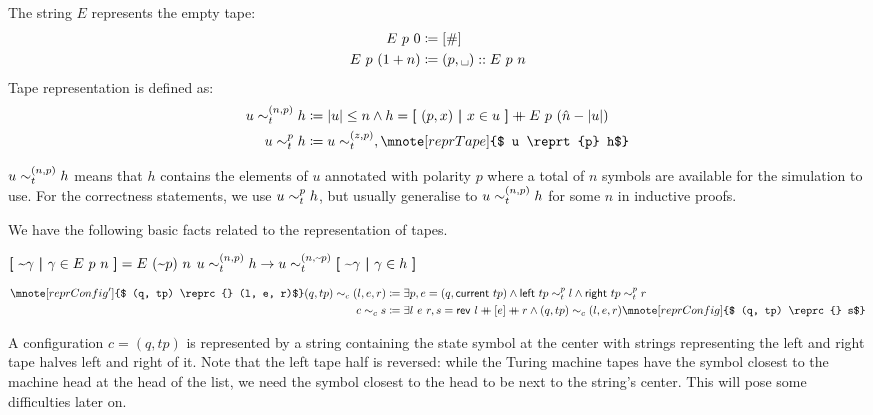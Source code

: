 \begin{definition}
  The string $E$ represents the empty tape: 
  \begin{align*}
    \nilstr{p}{0} &\defeq [\#] \\
    \nilstr{p}{(\natS{n})} &\defeq (p, \blank) :: \nilstr{p}{n}
  \end{align*}
  Tape representation is defined as:
  \begin{align*}
    u \reprtt{n}{p} h &\defeq \length{u} \le n \land h = \withl(p, x) \withm x \in u\withr \concat \nilstr{p}{(\hat{n} - \length{u})}\\
    u \reprt{p} h &\defeq u \reprtt{z}{p}, \mnote[reprTape]{$ u \reprt{p} h$}
  \end{align*}
\end{definition}
$u \sim_t^{(n, p)} h$ means that $h$ contains the elements of $u$ annotated with polarity $p$ where a total of $n$ symbols are available for the simulation to use.
For the correctness statements, we use $u \sim_t^{p} h$, but usually generalise to $u \sim_t^{(n, p)} h$ for some $n$ in inductive proofs. 

\begin{proposition}\label{prop:tapefacts}\leavevmode
  We have the following basic facts related to the representation of tapes.
  \begin{enumerate}
    \coqitem[E_polarityFlip] $\textbf{[}~ \text{\textasciitilde}\gamma ~\textbf{|}~ \gamma \in E~p~n ~\textbf{]} = E~(\text{\textasciitilde}p)~n$
     $u \sim_t^{(n, p)} h \rightarrow u \sim_t^{(n, \text{\textasciitilde}p)} \textbf{[}~ \text{\textasciitilde}\gamma ~\textbf{|}~ \gamma \in h ~\textbf{]}$
  \end{enumerate}
\end{proposition}

\begin{definition}
  \begin{align*}
    \mnote[reprConfig']{$ (q, tp) \reprc{} (l, e, r)$}
    (q, tp) \reprc{} (l, e, r) &\defeq \exists p, e = (q, \tmcurrent{tp}) \land \tmleft{tp} \reprt{p} l \land \tmright{tp} \reprt{p} r \\
    c \reprc{} s &\defeq \exists l~ e~ r, s = \rev~{l} \concat{} [e] \concat{} r \land (q, tp) \reprc{} (l, e, r) \mnote[reprConfig]{$ (q, tp) \reprc{} s$}
  \end{align*}
\end{definition}
A configuration $c = (q, tp)$ is represented by a string containing the state symbol at the center with strings representing the left and right tape halves left and right of it. Note that the left tape half is reversed: while the Turing machine tapes have the symbol closest to the machine head at the head of the list, we need the symbol closest to the head to be next to the string's center. This will pose some difficulties later on.


